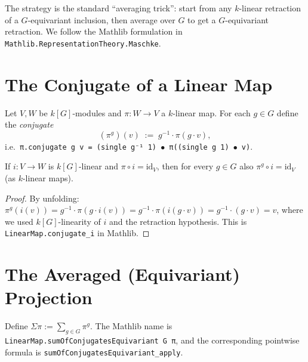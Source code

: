 The strategy is the standard ``averaging trick'': start from any $k$-linear
retraction of a $G$-equivariant inclusion, then average over $G$ to get a
$G$-equivariant retraction. We follow the Mathlib formulation in
\texttt{Mathlib.RepresentationTheory.Maschke}.

\section{The Conjugate of a Linear Map}

\begin{definition}
  \label{def:conjugate}
  \mathlibok
  Let $V, W$ be $k[G]$-modules and $\pi : W \to V$ a $k$-linear map. For each
  $g \in G$ define the \emph{conjugate}
  \[
    (\pi^g)(v) \;:=\; g^{-1} \cdot \pi(g \cdot v),
  \]
  i.e.\ \texttt{π.conjugate g v = (single g⁻¹ 1) \(\bullet\) π((single g 1) \(\bullet\) v)}.
\end{definition}

\begin{lemma}
  \label{lem:conjugate-of-i}
  \mathlibok
  If $i : V \to W$ is $k[G]$-linear and $\pi \circ i = \mathrm{id}_V$, then
  for every $g \in G$ also $\pi^g \circ i = \mathrm{id}_V$ (as $k$-linear maps).
\end{lemma}

\begin{proof}
  \leanok
  By unfolding: $\pi^g(i(v)) = g^{-1}\cdot\pi(g\cdot i(v)) = g^{-1}\cdot\pi(i(g\cdot v))
  = g^{-1}\cdot(g\cdot v) = v$, where we used $k[G]$-linearity of $i$ and the
  retraction hypothesis. This is \texttt{LinearMap.conjugate\_i} in Mathlib.
\end{proof}

\section{The Averaged (Equivariant) Projection}

\begin{definition}
  \label{def:sum-of-conjugates}
  \mathlibok
  Define $\Sigma\pi := \sum_{g \in G} \pi^g$.  The Mathlib name is
  \texttt{LinearMap.sumOfConjugatesEquivariant G π}, and the corresponding
  pointwise formula is \texttt{sumOfConjugatesEquivariant\_apply}.
\end{definition}

